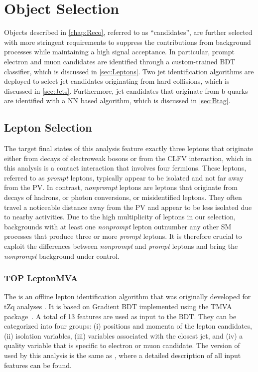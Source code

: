 \chapter{Object Selection}
\label{chap:Objects}

Objects described in \autoref{chap:Reco}, referred to as ``candidates'', are further selected with more stringent requirements to suppress the contributions from background processes while maintaining a high signal acceptance. In particular, prompt electron and muon candidates are identified through a custom-trained \ac{BDT} classifier, which is discussed in \autoref{sec:Leptons}. Two jet identification algorithms are deployed to select jet candidates originating from hard collisions, which is discussed in \autoref{sec:Jets}. Furthermore, jet candidates that originate from b quarks are identified with a \ac{NN} based algorithm, which is discussed in \autoref{sec:Btag}. 
\section{Lepton Selection}
\label{sec:Leptons}

The target final states of this analysis feature exactly three leptons that originate either from decays of electroweak bosons or from the \ac{CLFV} interaction, which in this analysis is a contact interaction that involves four fermions. These leptons, referred to as \emph{prompt} leptons, typically appear to be isolated and not far away from the \ac{PV}. In contrast, \emph{nonprompt} leptons are leptons that originate from decays of hadrons, or photon conversions, or misidentified leptons. They often travel a noticeable distance away from the \ac{PV} and appear to be less isolated due to nearby activities. Due to the high multiplicity of leptons in our selection, backgrounds with at least one \emph{nonprompt} lepton outnumber any other \ac{SM} processes that produce three or more \emph{prompt} leptons. It is therefore crucial to exploit the differences between \emph{nonprompt} and \emph{prompt} leptons and bring the \emph{nonprompt} background under control. 
\subsection{TOP LeptonMVA}
\label{subsec:TOPMVA}

The \TOP is an offline lepton identification algorithm that was originally developed for tZq analyses \cite{CMS:2018sgc,CMS:2021ugv}. It is based on Gradient \ac{BDT} implemented using the TMVA package~\cite{TMVA:2007ngy}. A total of 13 features are used as input to the \ac{BDT}. They can be categorized into four groups: (i) positions and momenta of the lepton candidates, (ii) isolation variables, (iii) variables associated with the closest jet, and (iv) a quality variable that is specific to electron or muon candidate. The version of \TOP used by this analysis is the same as \cite{CMS:2021ugv}, where a detailed description of all input features can be found.

